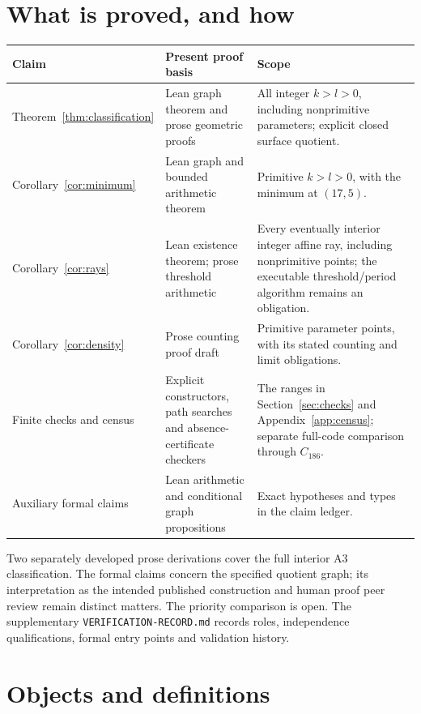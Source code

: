 \documentclass[11pt]{amsart}
\newcommand{\record}[1]{\nolinkurl{#1}}
\begin{document}
\section{What is proved, and how}\label{sec:guarantees}
\begin{center}\small
\begin{tabular}{p{}p{}p{}}
\toprule Claim & Present proof basis & Scope\\\midrule
Theorem~\ref{thm:classification} & Lean graph theorem and prose geometric proofs & All integer $k>l>0$, including nonprimitive parameters; explicit closed surface quotient.\\
Corollary~\ref{cor:minimum} & Lean graph and bounded arithmetic theorem & Primitive $k>l>0$, with the minimum at $(17,5)$.\\
Corollary~\ref{cor:rays} & Lean existence theorem; prose threshold arithmetic & Every eventually interior integer affine ray, including nonprimitive points; the executable threshold/period algorithm remains an obligation.\\
Corollary~\ref{cor:density} & Prose counting proof draft & Primitive parameter points, with its stated counting and limit obligations.\\
Finite checks and census & Explicit constructors, path searches and absence-certificate checkers & The ranges in Section~\ref{sec:checks} and Appendix~\ref{app:census}; separate full-code comparison through $C_{186}$.\\
Auxiliary formal claims & Lean arithmetic and conditional graph propositions & Exact hypotheses and types in the claim ledger.\\
\bottomrule
\end{tabular}
\end{center}
Two separately developed prose derivations cover the full interior A3
classification. The formal claims concern the specified quotient graph;
its interpretation as the intended published construction and human
proof peer review remain distinct matters. The priority comparison is
open. The supplementary \record{VERIFICATION-RECORD.md} records roles,
independence qualifications, formal entry points and validation history.

\section{Objects and definitions}\label{sec:definitions}
\end{document}
